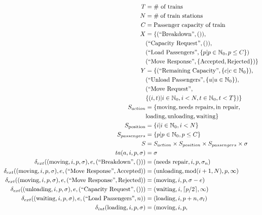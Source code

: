 \begin{align*}
    T &= \text{\# of trains} \\
    N &= \# \text{\;of train stations} \\
    C &= \text{Passenger capacity of train} \\
    X &= \{
      \InBreakDown, \\
      &  \InCapReq, \\
      &  \InLoadPassengers{\{ p | p \in \mathbb{N}_0, p \leq C \}} \\
      &  \InMoveRes{\{ \text{Accepted}, \text{Rejected} \}}
    \} \\
    Y &= \{
      \OutRemainingCapacity{\{ c | c \in \mathbb{N}_0 \}}, \\
      &  \OutUnloadPassengers{\{ u | u \in \mathbb{N}_0 \}}, \\
      &  \OutMoveReq{\\ 
        & \{ (i, t) | i \in \mathbb{N}_0, i < N, t \in \mathbb{N}_0, t < T \}}
    \} \\
    S_{action} &= \{
      \text{moving}, \text{needs repairs}, \text{in repair}, \\
      &  \text{loading}, \text{unloading}, \text{waiting} 
    \} \\
    S_{\text{position}} &= \{ i | i \in \mathbb{N}_0, i < N
    \} \\
    S_{passengers} &= \{ p | p \in \mathbb{N}_0, p \leq C \} \\
    S &= S_{action} \times S_{position} \times S_{passengers} \times \sigma \\
    ta(a, i, p, \sigma) &= \sigma \\
    \delta_{ext}((\text{moving}, i, p, \sigma), e, \InBreakDown) &= 
        (\text{needs repair}, i, p, \sigma_n) \\
    \delta_{ext}((\text{moving}, i, p, \sigma), e, \InMoveRes{\text{Accepted}})
        &= (\text{unloading}, \Mod{i+1}{N}, p, \infty) \\
    \delta_{ext}((\text{moving}, i, p, \sigma), e, \InMoveRes{\text{Rejected}})
        &= (\text{moving}, i, p, \sigma - e) \\
    \delta_{ext}((\text{unloading}, i, p, \sigma), e, \InCapReq) &=
        (\text{waiting}, i, \ceil*{p/2}, \infty) \\
    \delta_{ext}((\text{waiting}, i, p, \sigma), e, \InLoadPassengers{n}) &=
        (\text{loading}, i, p + n, \sigma_l) \\
    \delta_{int}(\text{loading}, i, p, \sigma) &= (\text{moving}, i, p,

\end{align*}
